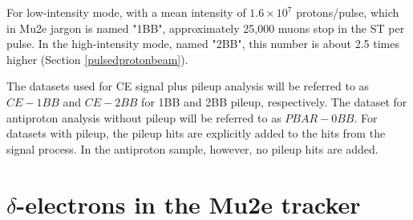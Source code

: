 For low-intensity mode, with a mean intensity of 
$1.6 \times 10^7$ protons/pulse, which in Mu2e 
jargon is named "1BB", approximately 25,000 
muons stop in the ST per pulse. In the high-intensity 
mode, named "2BB", this number is about 2.5 times higher (Section \ref{pulsedprotonbeam}).

The datasets used for CE signal plus pileup 
analysis will be referred to as $CE-1BB$ and $CE-2BB$ 
for 1BB and 2BB pileup, respectively. The dataset for 
antiproton analysis without pileup will be 
referred to as $PBAR-0BB$.
For datasets with pileup, 
the pileup hits are explicitly added to the hits from 
the signal process. In the antiproton sample, however, 
no pileup hits are added. 
\section{$\delta$-electrons in the Mu2e tracker}\label{trackerdeltas}

